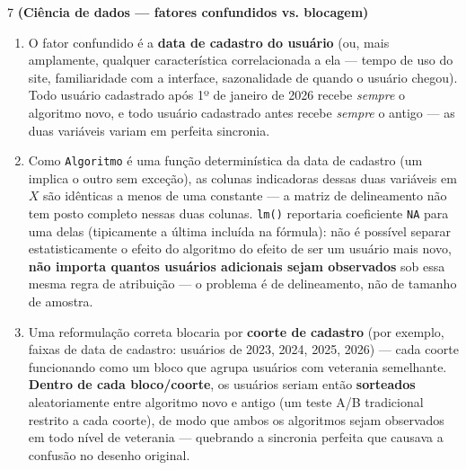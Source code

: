 \documentclass[11pt]{article}
\begin{document}
\begin{questao}{7} \textbf{(Ciência de dados --- fatores confundidos vs. blocagem)}
\end{questao}
\begin{solucao}
\begin{enumerate}[label=(\alph*)]
  \item O fator confundido é a \textbf{data de cadastro do usuário} (ou, mais amplamente,
    qualquer característica correlacionada a ela — tempo de uso do site, familiaridade com a
    interface, sazonalidade de quando o usuário chegou). Todo usuário cadastrado após 1º de
    janeiro de 2026 recebe \emph{sempre} o algoritmo novo, e todo usuário cadastrado antes recebe
    \emph{sempre} o antigo — as duas variáveis variam em perfeita sincronia.
  \item Como \texttt{Algoritmo} é uma função determinística da data de cadastro (um implica o
    outro sem exceção), as colunas indicadoras dessas duas variáveis em $X$ são idênticas a menos
    de uma constante — a matriz de delineamento não tem posto completo nessas duas colunas.
    \texttt{lm()} reportaria coeficiente \texttt{NA} para uma delas (tipicamente a última incluída
    na fórmula): não é possível separar estatisticamente o efeito do algoritmo do efeito de ser um
    usuário mais novo, \textbf{não importa quantos usuários adicionais sejam observados} sob essa
    mesma regra de atribuição — o problema é de delineamento, não de tamanho de amostra.
  \item Uma reformulação correta blocaria por \textbf{coorte de cadastro} (por exemplo, faixas de
    data de cadastro: usuários de 2023, 2024, 2025, 2026) — cada coorte funcionando como um bloco
    que agrupa usuários com veterania semelhante. \textbf{Dentro de cada bloco/coorte}, os
    usuários seriam então \textbf{sorteados} aleatoriamente entre algoritmo novo e antigo (um
    teste A/B tradicional restrito a cada coorte), de modo que ambos os algoritmos sejam
    observados em todo nível de veterania — quebrando a sincronia perfeita que causava a confusão
    no desenho original.
\end{enumerate}
\end{solucao}
\end{document}
